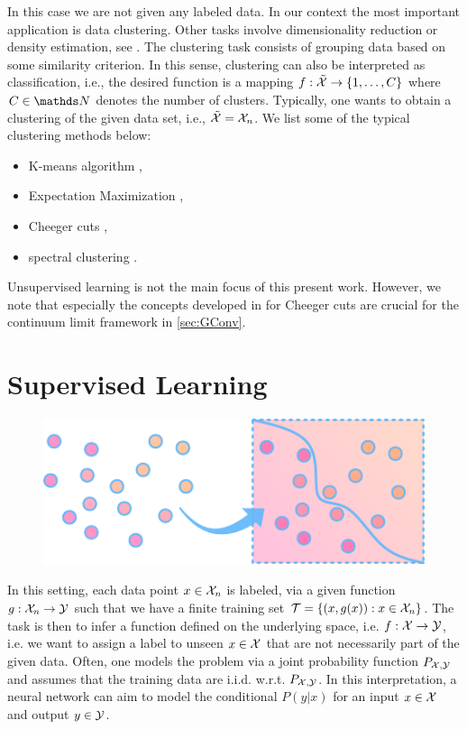 In this case we are not given any labeled data. In our context the most important application is data clustering. Other tasks involve dimensionality reduction or density estimation, see \cite{subramanya2014graph}. The clustering task consists of grouping data based on some similarity criterion. In this sense, clustering can also be interpreted as classification, i.e., the desired function is a mapping $f:\tilde{\mathcal{X}}\to \{1,\ldots, C\}$ where $C\in\N$ denotes the number of clusters. Typically, one wants to obtain a clustering of the given data set, i.e., $\tilde{\mathcal{X}} = \mathcal{X}_n$. We list some of the typical clustering methods below:
%
\begin{itemize}
\item K-means algorithm \cite{steinhaus1956division},
\item Expectation Maximization  \cite{dempster1977maximum},
\item Cheeger cuts \cite{GarcSlep15, szlam2009total, trillos2016consistency, garcia2022graph},
\item spectral clustering \cite{trillos2018variational, trillos2021geometric, hoffmann2022spectral}.
\end{itemize}
%
%
Unsupervised learning is not the main focus of this present work. However, we note that especially the concepts developed in \cite{GarcSlep15} for Cheeger cuts are crucial for the continuum limit framework in \cref{sec:GConv}.

\section{Supervised Learning}\label{sec:PSL}
\begin{figure}
\centering
\includegraphics[width=.5\textwidth]{atelier/paradigms/SL.pdf}
\end{figure}
%
In this setting, each data point $x\in\mathcal{X}_n$ is labeled, via a given function $g:\mathcal{X}_n\to\mathcal{\mathcal{Y}}$ such that we have a finite training set $\mathcal{T} = \{(x,g(x)): x\in\mathcal{X}_n\}$. The task is then to infer a function defined on the underlying space, i.e. $f:\mathcal{X} \to\mathcal{\mathcal{Y}}$, i.e. we want to assign a label to unseen $x\in\mathcal{X}$ that are not necessarily part of the given data. Often, one models the problem via a joint probability function $P_{\mathcal{X},\mathcal{\mathcal{Y}}}$ and assumes that the training data are i.i.d. w.r.t. $P_{\mathcal{X},\mathcal{\mathcal{Y}}}$. In this interpretation, a neural network can aim to model the conditional $P(y|x)$ for an input $x\in\mathcal{X}$ and output $y\in\mathcal{\mathcal{Y}}$.


